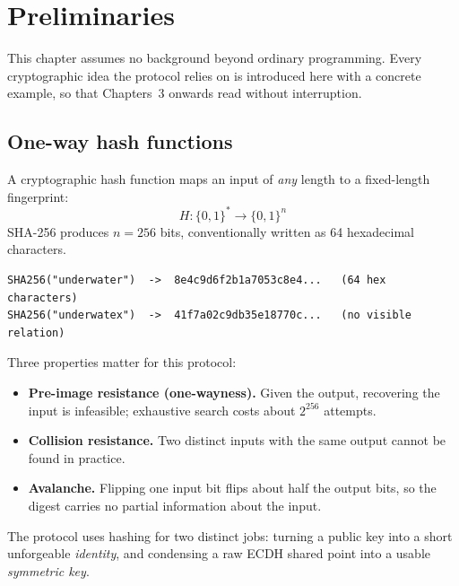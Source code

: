 \chapter{Preliminaries}
\label{ch:prelim}

This chapter assumes no background beyond ordinary programming. Every cryptographic idea the
protocol relies on is introduced here with a concrete example, so that Chapters~3 onwards
read without interruption.

\section{One-way hash functions}

A cryptographic hash function maps an input of \emph{any} length to a fixed-length
fingerprint:
\begin{equation}
H : \{0,1\}^{*} \longrightarrow \{0,1\}^{n}
\end{equation}
SHA-256 produces $n = 256$ bits, conventionally written as 64 hexadecimal characters.

\begin{lstlisting}[style=plain,caption={Avalanche: a one-character change alters roughly half the output bits.}]
SHA256("underwater")  ->  8e4c9d6f2b1a7053c8e4...   (64 hex characters)
SHA256("underwatex")  ->  41f7a02c9db35e18770c...   (no visible relation)
\end{lstlisting}

Three properties matter for this protocol:

\begin{itemize}
\item \textbf{Pre-image resistance (one-wayness).} Given the output, recovering the input is
      infeasible; exhaustive search costs about $2^{256}$ attempts.
\item \textbf{Collision resistance.} Two distinct inputs with the same output cannot be
      found in practice.
\item \textbf{Avalanche.} Flipping one input bit flips about half the output bits, so the
      digest carries no partial information about the input.
\end{itemize}

The protocol uses hashing for two distinct jobs: turning a public key into a short
unforgeable \emph{identity}, and condensing a raw ECDH shared point into a usable
\emph{symmetric key}.

